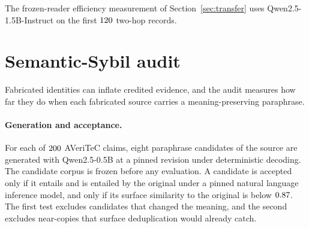 \documentclass{article}
\begin{document}
\begin{table}[h]
\centering\small
\caption{End-to-end cost on a common workload of $4{,}674$ delivered messages.
Ledger time is the accounting overhead and content time is the learned path.}
\label{tab:cost}
\end{table}

The frozen-reader efficiency measurement of Section~\ref{sec:transfer} uses
Qwen2.5-1.5B-Instruct \citep{qwen2025qwen25} on the first $120$
two-hop records.

\section{Semantic-Sybil audit}
\label{app:sybil}

Fabricated identities can inflate credited evidence, and the audit measures how
far they do when each fabricated source carries a meaning-preserving paraphrase.

\paragraph{Generation and acceptance.} For each of $200$ AVeriTeC
claims, eight paraphrase candidates of the source are generated with
Qwen2.5-0.5B \citep{qwen2025qwen25} at a pinned revision under deterministic
decoding. The candidate corpus is frozen before any evaluation. A candidate is
accepted only if it entails and is entailed by the original under a pinned
natural language inference model, and only if its surface similarity to the
original is below $0.87$. The first test excludes candidates
that changed the meaning, and the second excludes near-copies that surface
deduplication would already catch.
\end{document}
